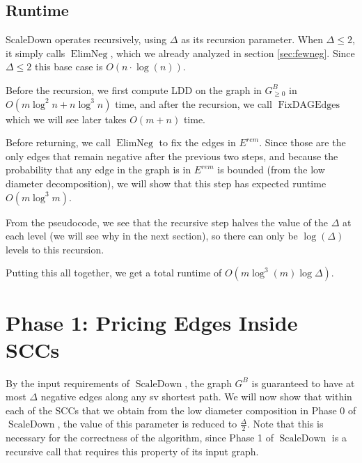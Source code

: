 \documentclass[11pt]{article}
\newcommand{\ElimNeg}{\operatorname{ElimNeg}}
\newcommand{\SPaverage}{\ElimNeg}
\newcommand{\ScaleDown}{\operatorname{ScaleDown}}
\newcommand{\FixAlmostDag}{\operatorname{FixDAGEdges}}
\newcommand{\esep}{E^{rem}}
\newcommand{\GB}{G^{B}}
\begin{document}
\subsection{Runtime}
\label{sec:scaledownruntime}
ScaleDown operates recursively, using $\Delta$ as its recursion parameter. When $\Delta \leq 2$, it simply calls $\SPaverage$, which we already analyzed in section \ref{sec:fewneg}. Since $\Delta \leq 2$ this base case is $O(n \cdot \log(n))$.

Before the recursion, we first compute LDD on the graph in $\GB_{\geq 0}$ in $O(m\log^2 n+n\log^3 n)$ time, and after the recursion, we call $\FixAlmostDag$ which we will see later takes $O(m + n)$ time.

Before returning, we call $\SPaverage$ to fix the edges in $\esep$. Since those are the only edges that remain negative after the previous two steps, and because the probability that any edge in the graph is in $\esep$ is bounded (from the low diameter decomposition), we will show that this step has expected runtime $O(m \log^3 m)$.

From the pseudocode, we see that the recursive step halves the value of the $\Delta$ at each level (we will see why in the next section), so there can only be $\log(\Delta)$ levels to this recursion.

Putting this all together, we get a total runtime of $O\left(m \log^3 (m) \log \Delta \right)$.

\section{Phase 1: Pricing Edges Inside SCCs}
By the input requirements of $\ScaleDown$, the graph $\GB$ is guaranteed to have at most $\Delta$ negative edges along any sv shortest path.
We will now show that within each of the SCCs that we obtain from the low diameter composition in Phase 0 of $\ScaleDown$, the value of this parameter is reduced to $\frac{\Delta}{2}$.
Note that this is necessary for the correctness of the algorithm, since Phase 1 of $\ScaleDown$ is a recursive call that requires this property of its input graph.
\end{document}
